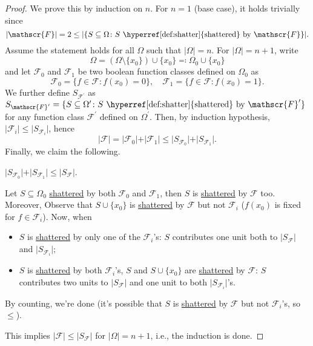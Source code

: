 \begin{proof}
	We prove this by induction on \(n\). For \(n = 1\) (base case), it holds trivially since
	\[
		\vert \mathscr{F} \vert = 2 \leq \vert \{ S \subseteq \Omega \colon S \text{ \hyperref[def:shatter]{shattered} by } \mathscr{F} \} \vert.
	\]
	Assume the statement holds for all \(\Omega \) such that \(\vert \Omega \vert = n\). For \(\vert \Omega \vert = n+1\), write
	\[
		\Omega = (\Omega \setminus \{ x_0 \} ) \cup \{ x_0 \} \eqqcolon \Omega _0 \cup \{ x_0 \}
	\]
	and let \(\mathscr{F} _0\) and \(\mathscr{F} _1\) be two boolean function classes defined on \(\Omega _0\) as
	\[
		\mathscr{F} _0 = \{ f\in \mathscr{F} \colon f(x_0) = 0\} ,\quad
		\mathscr{F} _1 = \{ f\in \mathscr{F} \colon f(x_0) = 1\} .
	\]
	We further define \(S_{\mathscr{F} ^{\prime} }\) as \(S_{\mathscr{F} ^{\prime} } = \{ S \subseteq \Omega ^{\prime} \colon S \text{ \hyperref[def:shatter]{shattered} by } \mathscr{F} ^{\prime} \}\) for any function class \(\mathscr{F} ^{\prime} \) defined on \(\Omega ^{\prime} \). Then, by induction hypothesis, \(\vert \mathscr{F} _i \vert \leq \vert S_{\mathscr{F} _i} \vert \), hence
	\[
		\vert \mathscr{F} \vert
		= \vert \mathscr{F} _0 \vert + \vert \mathscr{F} _1 \vert
		\leq \vert S_{\mathscr{F} _0} \vert + \vert S_{\mathscr{F} _1} \vert.
	\]
	Finally, we claim the following.

	\begin{claim}
		\(\vert S_{\mathscr{F} _0} \vert + \vert S_{\mathscr{F} _1} \vert \leq \vert S _{\mathscr{F} } \vert\).
	\end{claim}
	\begin{explanation}
		Let \(S \subseteq \Omega _0\) \hyperref[def:shatter]{shattered} by both \(\mathscr{F} _0\) and \(\mathscr{F} _1\), then \(S\) is \hyperref[def:shatter]{shattered} by \(\mathscr{F} \) too. Moreover, Observe that \(S \cup \{ x_0 \} \) is \hyperref[def:shatter]{shattered} by \(\mathscr{F} \) but not \(\mathscr{F} _i\) (\(f(x_0)\) is fixed for \(f\in \mathscr{F} _i\)). Now, when
		\begin{itemize}
			\item \(S\) is \hyperref[def:shatter]{shattered} by only one of the \(\mathscr{F} _i\)'s: \(S\) contributes one unit both to \(\vert S_{\mathscr{F} } \vert \) and \(\vert S_{\mathscr{F} _i} \vert \);
			\item \(S\) is \hyperref[def:shatter]{shattered} by both \(\mathscr{F} _i\)'s, \(S\) and \(S \cup \{ x_0 \} \) are \hyperref[def:shatter]{shattered} by \(\mathscr{F} \): \(S\) contributes two units to \(\vert S_{\mathscr{F} } \vert \) and one unit to both \(\vert S_{\mathscr{F} _i} \vert \)'s.
		\end{itemize}
		By counting, we're done (it's possible that \(S\) is \hyperref[def:shatter]{shattered} by \(\mathscr{F} \) but not \(\mathscr{F} _i\)'s, so \(\leq \)).
	\end{explanation}

	This implies \(\vert \mathscr{F} \vert \leq \vert S_{\mathscr{F} } \vert \) for \(\vert \Omega \vert = n+1\), i.e., the induction is done.
\end{proof}

